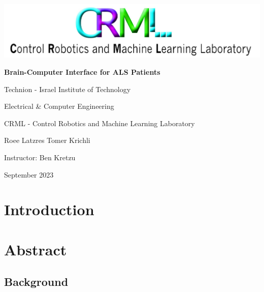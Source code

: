\documentclass{article}
\begin{document}
\fontsize{13}{11}\selectfont
\begin{titlepage}
    \centering
    
    \vspace*{2cm}
    
    \includegraphics[]{Cover Page/CRML-logo.jpg} %
    
    \vspace{2cm}
    
    {\LARGE \textbf{Brain-Computer Interface for ALS Patients}}
    
    \vspace{1.5cm}
    
    {\Large Technion - Israel Institute of Technology}
    
    {\Large Electrical \& Computer Engineering}

    \vspace{1.5cm}
    
    {\Large CRML - Control Robotics and Machine Learning Laboratory}
    
    \vspace{2cm}
    
    {\Large Roee Latzres \hspace{2cm} Tomer Krichli}
    
    \vspace{1cm}
    
    {\large Instructor: Ben Kretzu}
    
    \vspace{1cm}
    
    {\large September 2023}
    
\end{titlepage}

\newpage
\tableofcontents
\newpage
\section{Introduction}
\section{Abstract}
\subsection{Background}
\end{document}
